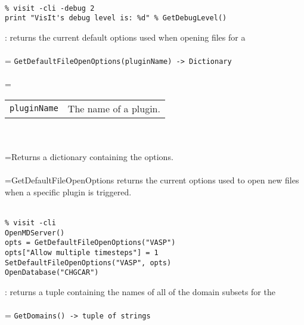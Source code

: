\documentclass[10pt,a4paper]{report}
\begin{document}
\\[-6mm]
\begin{verbatim}% visit -cli -debug 2
print "VisIt's debug level is: %d" % GetDebugLevel()
\end{verbatim}
\newpage


{}
: returns the current default options used when opening files for a\\[-3mm]

 \\ 
\hangindent=\parindent 
\verb!GetDefaultFileOpenOptions(pluginName) -> Dictionary!\\ [-3mm]

 \\ 
\hangindent=\parindent 
\begin{tabular}{ll}
\verb!pluginName! & The name of a plugin. \\
\end{tabular} \\[-2mm]


 \\ 
\hangindent=\parindent Returns a dictionary containing the options. \\[-3mm] 

 \\ 
\hangindent=\parindent GetDefaultFileOpenOptions returns the current options used to open new files when a specific plugin is triggered. \\[-3mm] 

\\[-6mm]
\begin{verbatim}% visit -cli
OpenMDServer()
opts = GetDefaultFileOpenOptions("VASP")
opts["Allow multiple timesteps"] = 1
SetDefaultFileOpenOptions("VASP", opts)
OpenDatabase("CHGCAR")
\end{verbatim}
\newpage


{}
: returns a tuple containing the names of all of the domain subsets for the\\[-3mm]

 \\ 
\hangindent=\parindent 
\verb!GetDomains() -> tuple of strings!\\ [-3mm]
\end{document}
